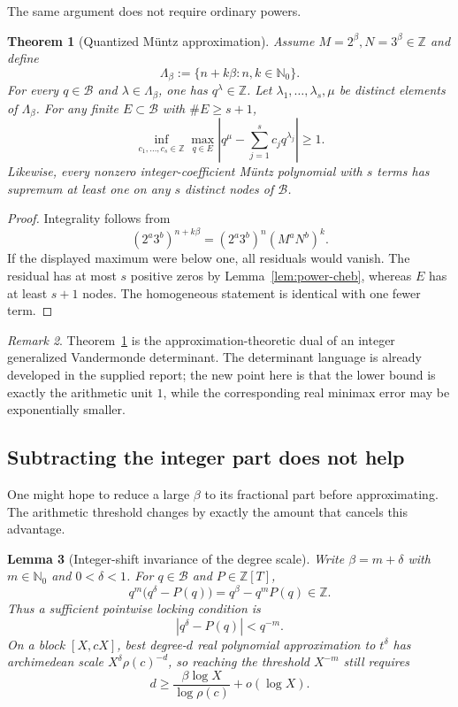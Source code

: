 \documentclass[11pt,oneside]{article}
\newtheorem{theorem}{Theorem}[section]
\newtheorem{lemma}[theorem]{Lemma}
\theoremstyle{definition}
\theoremstyle{remark}
\newtheorem{remark}[theorem]{Remark}
\newcommand{\Nzero}{\mathbb N_0}
\newcommand{\Z}{\mathbb Z}
\newcommand{\Bsem}{\mathcal B}
\newcommand{\Lsem}{\Lambda}
\begin{document}
The same argument does not require ordinary powers.

\begin{theorem}[Quantized M\"untz approximation]
\label{thm:muntz-lock}
Assume $M=2^\beta,N=3^\beta\in\Z$ and define
\[
  \Lsem_\beta:=\{n+k\beta:n,k\in\Nzero\}.
\]
For every $q\in\Bsem$ and $\lambda\in\Lsem_\beta$, one has $q^\lambda\in\Z$.
Let $\lambda_1,\ldots,\lambda_s,\mu$ be distinct elements of $\Lsem_\beta$.  For any finite
$E\subset\Bsem$ with $\#E\ge s+1$,
\[
 \inf_{c_1,\ldots,c_s\in\Z}
 \max_{q\in E}\left|q^\mu-\sum_{j=1}^sc_jq^{\lambda_j}\right|\ge1.
\]
Likewise, every nonzero integer-coefficient M\"untz polynomial with $s$ terms has supremum at
least one on any $s$ distinct nodes of $\Bsem$.
\end{theorem}

\begin{proof}
Integrality follows from
\[
 (2^a3^b)^{n+k\beta}=(2^a3^b)^n(M^aN^b)^k.
\]
If the displayed maximum were below one, all residuals would vanish.  The residual has at
most $s$ positive zeros by Lemma~\ref{lem:power-cheb}, whereas $E$ has at least $s+1$ nodes.
The homogeneous statement is identical with one fewer term.
\end{proof}

\begin{remark}
Theorem~\ref{thm:muntz-lock} is the approximation-theoretic dual of an integer generalized
Vandermonde determinant.  The determinant language is already developed in the supplied
report; the new point here is that the lower bound is exactly the arithmetic unit $1$, while
the corresponding real minimax error may be exponentially smaller.
\end{remark}

\subsection{Subtracting the integer part does not help}

One might hope to reduce a large $\beta$ to its fractional part before approximating.  The
arithmetic threshold changes by exactly the amount that cancels this advantage.

\begin{lemma}[Integer-shift invariance of the degree scale]
\label{lem:integer-shift}
Write $\beta=m+\delta$ with $m\in\Nzero$ and $0<\delta<1$.  For $q\in\Bsem$ and
$P\in\Z[T]$,
\[
 q^m\bigl(q^\delta-P(q)\bigr)=q^\beta-q^mP(q)\in\Z.
\]
Thus a sufficient pointwise locking condition is
\[
 |q^\delta-P(q)|<q^{-m}.
\]
On a block $[X,cX]$, best degree-$d$ real polynomial approximation to $t^\delta$ has
archimedean scale $X^\delta\rho(c)^{-d}$, so reaching the threshold $X^{-m}$ still requires
\[
 d\ge \frac{\beta\log X}{\log\rho(c)}+o(\log X).
\]
\end{lemma}
\end{document}
